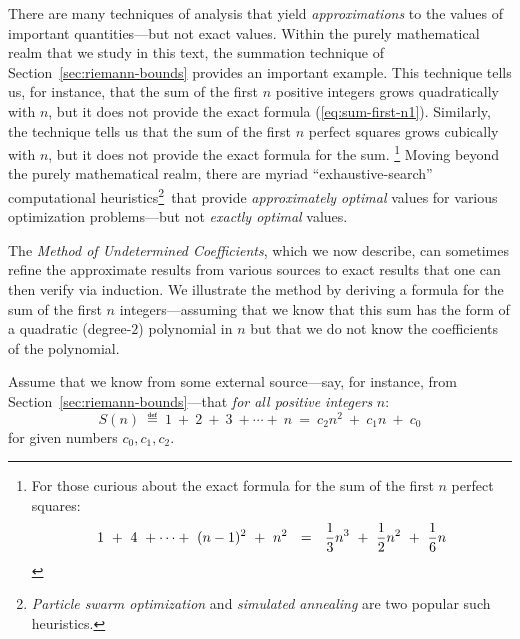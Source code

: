 There are many techniques of analysis that yield {\em approximations}
to the values of important quantities---but not exact values.  Within
the purely mathematical realm that we study in this text, the
summation technique of Section~\ref{sec:riemann-bounds} provides an
important example.  This technique tells us, for instance, that the
sum of the first $n$ positive integers grows quadratically with $n$,
but it does not provide the exact formula (\ref{eq:sum-first-n1}).
Similarly, the technique tells us that the sum of the first $n$
perfect squares grows cubically with $n$, but it does not provide the
exact formula for the sum.
\footnote{For those curious about the exact
  formula for the sum of the first $n$ perfect squares:
\begin{equation}
\label{eq:sum-1-to-nsq1}
1 \ + \ 4 \ + \cdots + \ (n-1)^2 \ + \ n^2 
 \ \ = \ \
{1 \over 3} n^3 \ + \ {1 \over 2} n^2 \ + \ {1 \over 6} n
\end{equation}}
Moving beyond the purely mathematical realm, there are myriad
``exhaustive-search'' computational heuristics\footnote{{\it Particle
    swarm optimization} \cite{KennedyE95} and {\it simulated
    annealing} \cite{KirkpatrickGV83} are two popular such
  heuristics.}~that provide {\em approximately optimal} values for various
optimization problems---but not {\em exactly optimal} values.

\medskip

The {\em Method of Undetermined Coefficients}, which we now describe,
can sometimes refine the approximate results from various sources to
exact results that one can then verify via induction.  We illustrate
the method by deriving a formula for the sum of the first $n$
integers---assuming that we know that this sum has the form of a
quadratic (degree-$2$) polynomial in $n$ but that we do not know the
coefficients of the polynomial.

Assume that we know from some external source---say, for instance,
from Section~\ref{sec:riemann-bounds}---that {\em for all positive
  integers} $n$:
\begin{equation}
\label{eq:formula-for-n}
S(n) \ \eqdef \
 1 \ + \ 2 \ + \ 3 \ + \cdots + \ n 
 \ = \ 
c_2 n^2 \ + \ c_1 n \ + \ c_0
\end{equation}
for given numbers $c_0, c_1, c_2$.

